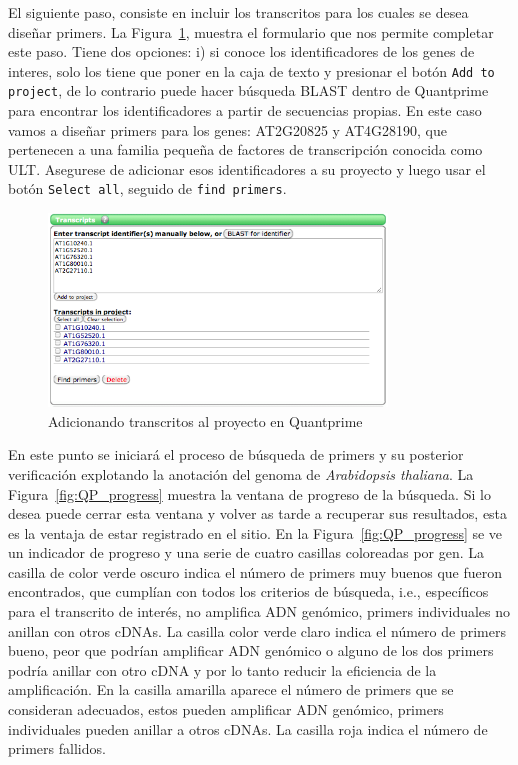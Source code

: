 \documentclass[letter,11pt]{book}
\begin{document}
El siguiente paso, consiste en  incluir los transcritos para los cuales se desea diseñar primers. La Figura~\ref{fig:QP_transcripts}, muestra el formulario que nos permite completar este paso. Tiene dos opciones: i) si conoce los identificadores de los genes de interes, solo los tiene que poner en la caja de texto y presionar el botón \Verb+Add to project+, de lo contrario puede hacer búsqueda BLAST dentro de {\sc Quantprime} para encontrar los identificadores a partir de secuencias propias. En este caso vamos a diseñar primers para los genes: AT2G20825 y AT4G28190, que pertenecen a una familia pequeña de factores de transcripción conocida como ULT. Asegurese de adicionar esos identificadores a su proyecto y luego usar el botón \Verb+Select all+, seguido de \Verb+find primers+.

\begin{figure}[h!]
\centering
 \includegraphics[width=9cm]{Figs/QP_transcripts.png}
 \caption{\label{fig:QP_transcripts}Adicionando transcritos al proyecto en  {\sc Quantprime}}
\end{figure}

En este punto se iniciará el proceso de búsqueda de primers y su posterior verificación explotando la anotación del genoma de \textit{Arabidopsis thaliana}. La Figura~\ref{fig:QP_progress} muestra la ventana de progreso de la búsqueda. Si lo desea puede cerrar esta ventana y volver as tarde a recuperar sus resultados, esta es la ventaja de estar registrado en el sitio. En la Figura~\ref{fig:QP_progress} se ve un indicador de progreso y una serie de cuatro casillas coloreadas por gen. La casilla de color verde oscuro indica el número de primers muy buenos que fueron encontrados, que cumplían con todos los criterios de búsqueda, i.e., específicos para el transcrito de interés, no amplifica ADN genómico, primers individuales no anillan con otros cDNAs. La casilla color verde claro indica el número de primers bueno, peor que podrían amplificar ADN genómico o alguno de los dos primers podría anillar con otro cDNA y por lo tanto reducir la eficiencia de la amplificación. En la casilla amarilla aparece el número de primers que se consideran adecuados, estos pueden amplificar ADN genómico, primers individuales pueden anillar a otros cDNAs. La casilla roja indica el número de primers fallidos.
\end{document}
